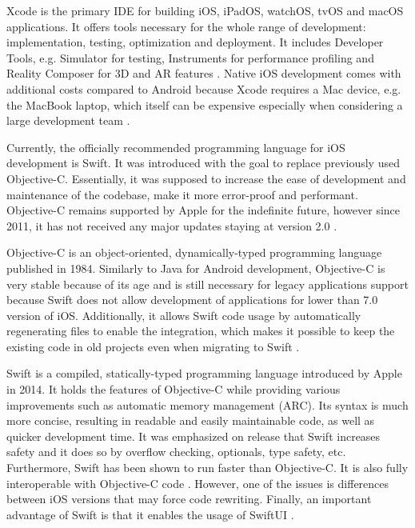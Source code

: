 Xcode is the primary IDE for building iOS, iPadOS, watchOS, tvOS and macOS applications. It offers tools necessary for the whole range of development: implementation, testing, optimization and deployment. It includes Developer Tools, e.g. Simulator for testing, Instruments for performance profiling and Reality Composer for 3D and AR features \cite{xcode_documentation}. Native iOS development comes with additional costs compared to Android because Xcode requires a Mac device, e.g. the MacBook laptop, which itself can be expensive especially when considering a large development team \cite{comparison_technologies_multiplatform,comp_study_hybrid}.

Currently, the officially recommended programming language for iOS development is Swift. It was introduced with the goal to replace previously used Objective-C. Essentially, it was supposed to increase the ease of development and maintenance of the codebase, make it more error-proof and performant. Objective-C remains supported by Apple for the indefinite future, however since 2011, it has not received any major updates staying at version 2.0 \cite{swift_overview,speed_performance_swift_objective_c,swift_vs_objective_c,wiki_objective_c}.

Objective-C is an object-oriented, dynamically-typed programming language published in 1984. Similarly to Java for Android development, Objective-C is very stable because of its age and is still necessary for legacy applications support because Swift does not allow development of applications for lower than 7.0 version of iOS. Additionally, it allows Swift code usage by automatically regenerating files to enable the integration, which makes it possible to keep the existing code in old projects even when migrating to Swift \cite{swift_objective_c_new_language,geeks_objective_c_swift}.

Swift is a compiled, statically-typed programming language introduced by Apple in 2014. It holds the features of Objective-C while providing various improvements such as automatic memory management (ARC). Its syntax is much more concise, resulting in readable and easily maintainable code, as well as quicker development time. It was emphasized on release that Swift increases safety and it does so by overflow checking, optionals, type safety, etc. Furthermore, Swift has been shown to run faster than Objective-C. It is also fully interoperable with Objective-C code \cite{swift_overview,swift_objective_c_new_language,geeks_objective_c_swift}. However, one of the issues is differences between iOS versions that may force code rewriting. Finally, an important advantage of Swift is that it enables the usage of SwiftUI \cite{comparison_technologies_multiplatform}.

